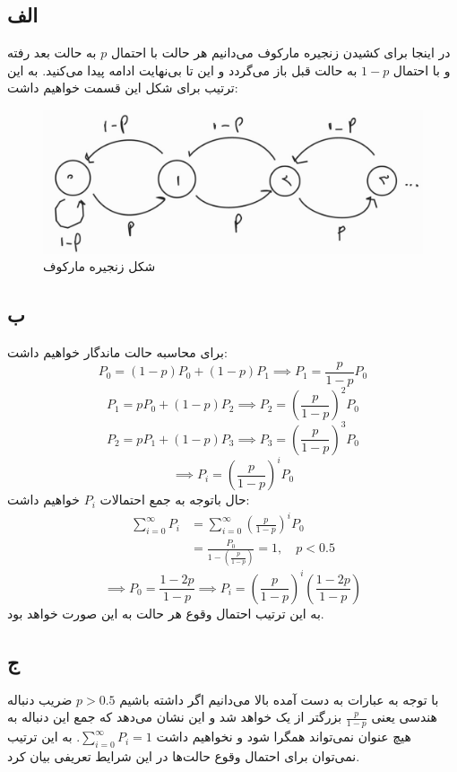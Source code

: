\subsection*{الف}
در اینجا برای کشیدن زنجیره مارکوف می‌دانیم هر حالت با احتمال
$p$
به حالت بعد رفته و با احتمال
$1 - p$ 
به حالت قبل باز می‌گردد و این تا بی‌نهایت ادامه پیدا می‌کنید. به این ترتیب برای شکل این قسمت خواهیم داشت:
\begin{figure}[h]
    \centering
    \includegraphics[scale = 0.3]{"commons/first.jpg"}
    \caption{شکل زنجیره مارکوف}
\end{figure}

\subsection*{ب}
برای محاسبه حالت ماندگار خواهیم داشت:
$$P_0 = (1 - p) P_0 + (1 - p) P_1 \implies P_1 = \frac{p}{1 - p} P_0$$
$$P_1 = p P_0 + (1 - p) P_2 \implies P_2 = \left(\frac{p}{1 - p}\right)^2 P_0$$
$$P_2 = p P_1 + (1 - p) P_3 \implies P_3 = \left(\frac{p}{1 - p}\right)^3 P_0$$
$$\implies P_i = \left(\frac{p}{1 - p}\right)^i P_0$$
حال باتوجه به جمع احتمالات
$P_i$
خواهیم داشت:
\begin{align*}
    \sum_{i = 0}^{\infty} P_i &= \sum_{i = 0}^{\infty} \left(\frac{p}{1 - p}\right)^i P_0 \\
                              &= \frac{P_0}{1 - \left(\frac{p}{1 - p}\right)} = 1, \quad p < 0.5
\end{align*}
$$ \implies P_0 = \frac{1 - 2p}{1 - p} \implies P_i = \left(\frac{p}{1 - p}\right)^i \left(\frac{1 - 2p}{1 - p}\right)$$
به این ترتیب احتمال وقوع هر حالت به این صورت خواهد بود.

\subsection*{ج}
با توجه به عبارات به دست آمده بالا می‌دانیم اگر داشته باشیم
$p > 0.5$
ضریب دنباله هندسی یعنی
$\frac{p}{1 - p}$
بزرگتر از یک خواهد شد و این نشان می‌دهد که جمع این دنباله به هیچ عنوان نمی‌تواند همگرا شود و نخواهیم داشت
$\sum_{i = 0}^{\infty} P_i = 1$.
به این ترتیب نمی‌توان برای احتمال وقوع حالت‌ها در این شرایط تعریفی بیان کرد.